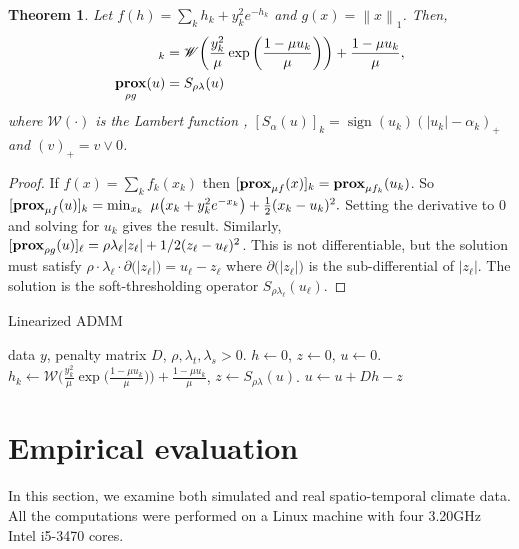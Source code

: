 \documentclass{article}
\newtheorem{theorem}{Theorem}%
\newcommand{\norm}[1]{\left\lVert #1 \right\rVert}
\DeclareMathOperator*{\prox}{\bf prox}
\DeclareMathOperator*{\sign}{sign}
\begin{document}
\begin{theorem}
  Let $f(h) = \sum_{k} h_{k} + y_{k}^2e^{-h_{k}}$ and $g(x) =
  \norm{x}_1$. Then, 
  \begin{align}
    [\prox_{\mu f}(u)]_k &= \mathscr{W}\bigg(\frac{y_k^2}{\mu}
    \exp\bigg(\frac{1-\mu u_k}{\mu}\bigg) \bigg) + \frac{1-\mu u_k}{\mu},\\
    \prox_{\rho g}(u) &= S_{\rho\lambda}(u)
  \end{align}
where $\mathscr{W}(\cdot)$ is the \textit{Lambert function} \cite{corless_lambertw_1996},  $[S_{\alpha}(u)]_k = \sign(u_k)(|u_k| -\alpha_k)_+$ and
$(v)_+=v\vee 0$.
\end{theorem}
\begin{proof}
  If $f(x)=\sum_k f_k(x_k)$ then $[\prox_{\mu f}(x)]_k =
  \prox_{\mu f_k}(u_k)$. So 
  $[\prox_{\mu f}(u)]_k=\min_{x_k} \,\,
  \mu\big(x_k+y_{k}^2e^{-x_{k}}\big)+\frac{1}{2}  (x_k-u_k)^2.$
  Setting the derivative to 0 and solving for $u_k$ gives the
  result. Similarly, $[\prox_{\rho g}(u)]_\ell=\rho
  \lambda_\ell |z_\ell|+1/2(z_\ell-u_\ell)^2$. This is not differentiable,
  but the solution must satisfy $\rho \cdot \lambda_\ell \cdot \partial
  \big(|z_\ell| \big)=u_\ell-z_\ell$ where $\partial \big(|z_\ell| \big)$ is the
  sub-differential of $|z_\ell|$. The solution is the soft-thresholding
  operator $S_{\rho\lambda_\ell}(u_\ell)$.
\end{proof}

\begin{algorithm}[tb]
  \caption{Linearized ADMM }
  \label{alg:linADMM}
  \begin{algorithmic}
     data $y$, penalty matrix $D$,
    $\rho,\lambda_t,\lambda_s >0$.
     $h\leftarrow 0$, $z\leftarrow 0$, $u\leftarrow 0$. 
    \STATE $h_k\leftarrow \mathscr{W}\bigg(\frac{y_k^2}{\mu}
    \exp\bigg(\frac{1-\mu u_k}{\mu}\bigg) \bigg) + \frac{1-\mu u_k}{\mu}$,
    \STATE $z\leftarrow S_{\rho\lambda}(u)$.
    \STATE $u\leftarrow u + Dh-z$
    \ENDFOR
  \end{algorithmic}
\end{algorithm}





\section{Empirical evaluation}
\label{sec:empirical-evaluation}

In this section, we examine both simulated and real spatio-temporal
climate data. All the computations were performed on a Linux machine
with four 3.20GHz Intel i5-3470 cores. 
\end{document}
